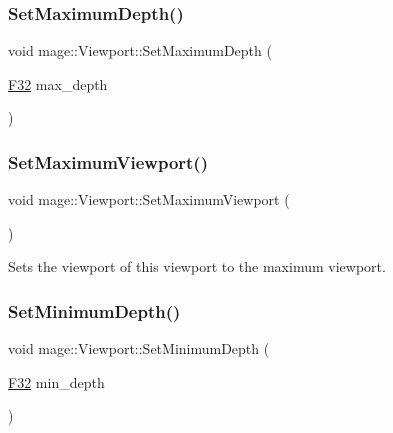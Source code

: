 \hypertarget{classmage_1_1_viewport_a5f3d52bcaeaa3048d4da86e363131455}{}\label{classmage_1_1_viewport_a5f3d52bcaeaa3048d4da86e363131455} 
\subsubsection{\texorpdfstring{Set\+Maximum\+Depth()}{SetMaximumDepth()}}
{\footnotesize\ttfamily void mage\+::\+Viewport\+::\+Set\+Maximum\+Depth (\begin{DoxyParamCaption}\item[{\hyperlink{namespacemage_aa97e833b45f06d60a0a9c4fc22ae02c0}{F32}}]{max\+\_\+depth }\end{DoxyParamCaption})\hspace{0.3cm}{\ttfamily [noexcept]}}

\hypertarget{classmage_1_1_viewport_a5af006b8ec0464a924c3822265727ee2}{}\label{classmage_1_1_viewport_a5af006b8ec0464a924c3822265727ee2} 
\subsubsection{\texorpdfstring{Set\+Maximum\+Viewport()}{SetMaximumViewport()}}
{\footnotesize\ttfamily void mage\+::\+Viewport\+::\+Set\+Maximum\+Viewport (\begin{DoxyParamCaption}{ }\end{DoxyParamCaption})\hspace{0.3cm}{\ttfamily [noexcept]}}

Sets the viewport of this viewport to the maximum viewport. \hypertarget{classmage_1_1_viewport_a7e5ea28ca50be25d48668bd8ce4995d5}{}\label{classmage_1_1_viewport_a7e5ea28ca50be25d48668bd8ce4995d5} 
\subsubsection{\texorpdfstring{Set\+Minimum\+Depth()}{SetMinimumDepth()}}
{\footnotesize\ttfamily void mage\+::\+Viewport\+::\+Set\+Minimum\+Depth (\begin{DoxyParamCaption}\item[{\hyperlink{namespacemage_aa97e833b45f06d60a0a9c4fc22ae02c0}{F32}}]{min\+\_\+depth }\end{DoxyParamCaption})\hspace{0.3cm}{\ttfamily [noexcept]}}

